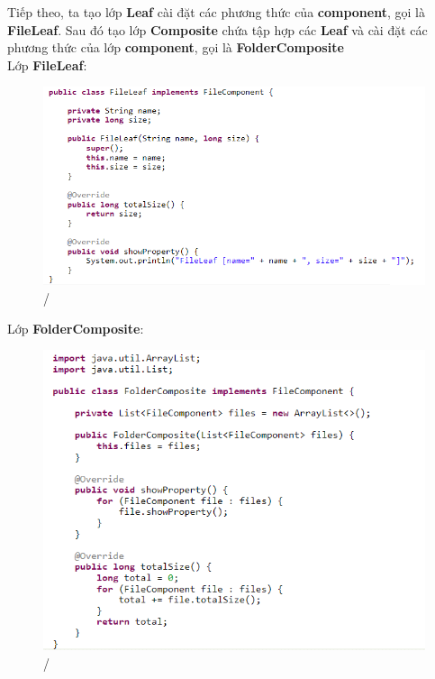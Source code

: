 Tiếp theo, ta tạo lớp \textbf{Leaf} cài đặt các phương thức của \textbf{component}, gọi là \textbf{FileLeaf}. Sau đó tạo lớp \textbf{Composite} chứa tập hợp các \textbf{Leaf} và cài đặt các phương thức của lớp \textbf{component}, gọi là \textbf{FolderComposite}\\[0.1in]

Lớp \textbf{FileLeaf}:
\begin{figure}[!htb]
    \centering
    \includegraphics[width=\textwidth]{fig/Composite/FileLeaf.png}/
\end{figure}\newpage

Lớp \textbf{FolderComposite}:
\begin{figure}[!htb]
    \centering
    \includegraphics[width=\textwidth]{fig/Composite/FolderComposite.png}/
\end{figure}

